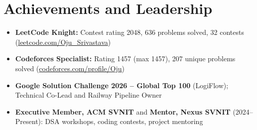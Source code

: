 \documentclass[a4paper,10pt]{article}
\begin{document}
\section{Achievements and Leadership}
\small
\begin{itemize}
  \item \textbf{LeetCode Knight:} Contest rating 2048, 636 problems solved, 32 contests (\href{https://leetcode.com/Oju_Srivastava}{leetcode.com/Oju\_Srivastava})
  \item \textbf{Codeforces Specialist:} Rating 1457 (max 1457), 207 unique problems solved (\href{https://codeforces.com/profile/Oju}{codeforces.com/profile/Oju})
  \item \textbf{Google Solution Challenge 2026 -- Global Top 100} (LogiFlow); Technical Co-Lead and Railway Pipeline Owner
  \item \textbf{Executive Member, ACM SVNIT} and \textbf{Mentor, Nexus SVNIT} (2024--Present): DSA workshops, coding contests, project mentoring
\end{itemize}
\end{document}
